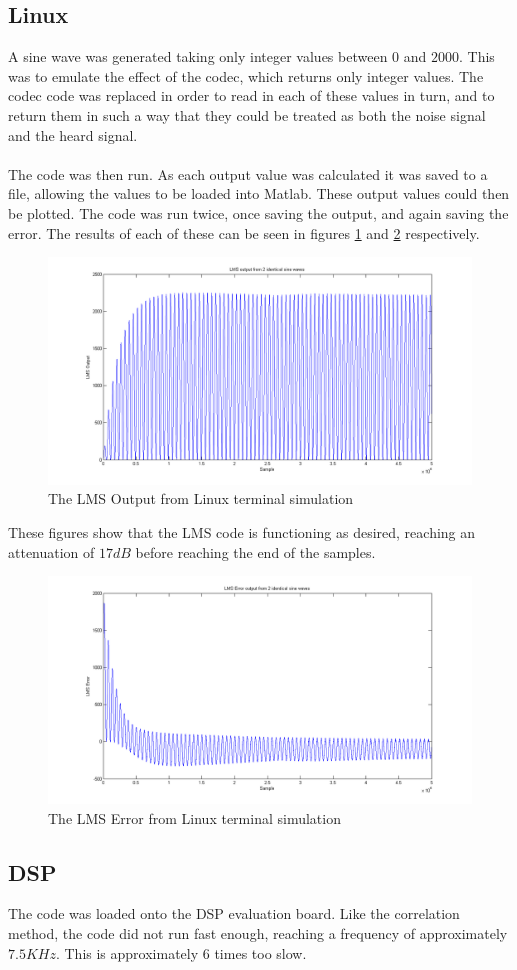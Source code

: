 \subsection{Linux}
A sine wave was generated taking only integer values between $0$ and $2000$.
This was to emulate the effect of the codec, which returns only integer values.
The codec code was replaced in order to read in each of these values in turn, and to return them in such a way that they could be treated as both the noise signal and the heard signal.
\\
\\
The code was then run.
As each output value was calculated it was saved to a file, allowing the values to be loaded into Matlab.
These output values could then be plotted.
The code was run twice, once saving the output, and again saving the error.
The results of each of these can be seen in figures \ref{fig:testlmslinuxout} and \ref{fig:testlmslinuxerr} respectively.

\begin{figure}[H]
	\centering
	\includegraphics[width=\textwidth]{./img/lms_linux_out.png}
	\caption{The LMS Output from Linux terminal simulation}
	\label{fig:testlmslinuxout}
\end{figure}

\noindent These figures show that the LMS code is functioning as desired, reaching an attenuation of $17dB$ before reaching the end of the samples.

\begin{figure}[H]
	\centering
	\includegraphics[width=\textwidth]{./img/lms_linux_err.png}
	\caption{The LMS Error from Linux terminal simulation}
	\label{fig:testlmslinuxerr}
\end{figure}

\subsection{DSP}
The code was loaded onto the DSP evaluation board.
Like the correlation method, the code did not run fast enough, reaching a frequency of approximately $7.5KHz$.
This is approximately 6 times too slow.

